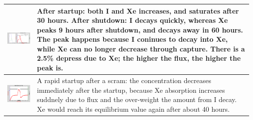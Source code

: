 \documentclass{school-22.211-notes}
\begin{document}
\begin{table}
  \centering
  \begin{tabular}{|p{}|p{}|}\hline
    \begin{minipage}[b]{0.6\textwidth}
      \includegraphics[width=3.5in]{images/dfs/I-Xe-1.png} 
    \end{minipage}
    & 
    \begin{minipage}[b]{0.4\textwidth}
      After startup: both I and Xe increases, and saturates after 30 hours. After shutdown: I decays quickly, whereas Xe peaks 9 hours after shutdown, and decays away in 60 hours. The peak happens because I coninues to decay into Xe, while Xe can no longer decrease through capture. 
There is a 2.5\% depress due to Xe; the higher the flux, the higher the peak is.
    \end{minipage}   \\ \hline
%
    \begin{minipage}[b]{0.6\textwidth}
      \includegraphics[width=3.5in]{images/dfs/I-Xe-2.png} 
    \end{minipage}
    & 
    \begin{minipage}[b]{0.4\textwidth}    
      A rapid startup after a scram: the concentration decreases immediately after the startup, because Xe absorption increases suddnely due to flux and the over-weight the amount from I decay. Xe would reach its equilibrium value again after about 40 hours. 
    \end{minipage}  \\ \hline

\end{tabular}
\end{table}
\end{document}
